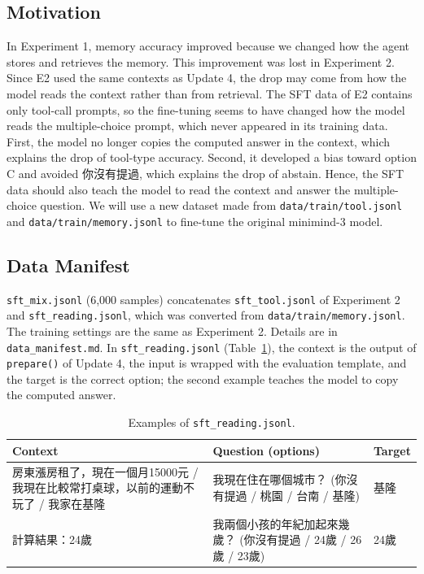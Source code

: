 \documentclass{article}
\begin{document}
\subsection{Motivation}
\label{sec:e3motivation}
In Experiment 1, memory accuracy improved because we changed how the agent stores and retrieves the memory.
This improvement was lost in Experiment 2.
Since E2 used the same contexts as Update 4, the drop may come from how the model reads the context rather than from retrieval.
The SFT data of E2 contains only tool-call prompts, so the fine-tuning seems to have changed how the model reads the multiple-choice prompt, which never appeared in its training data.
First, the model no longer copies the computed answer in the context, which explains the drop of tool-type accuracy.
Second, it developed a bias toward option C and avoided 你沒有提過, which explains the drop of abstain.
Hence, the SFT data should also teach the model to read the context and answer the multiple-choice question.
We will use a new dataset made from \texttt{data/train/tool.jsonl} and \texttt{data/train/memory.jsonl} to fine-tune the original minimind-3 model.
\subsection{Data Manifest}
\texttt{sft\_mix.jsonl} (6,000 samples) concatenates \texttt{sft\_tool.jsonl} of Experiment 2 and \texttt{sft\_reading.jsonl}, which was converted from \texttt{data/train/memory.jsonl}.
The training settings are the same as Experiment 2. Details are in \texttt{data\_manifest.md}.
In \texttt{sft\_reading.jsonl} (Table~\ref{tab:e3data}), the context is the output of \texttt{prepare()} of Update 4, the input is wrapped with the evaluation template, and the target is the correct option; the second example teaches the model to copy the computed answer.
\begin{table}[H]
    \centering
    \footnotesize
    \begin{tabular}{p{7.6cm}p{7.6cm}l}
        \toprule
        Context & Question (options) & Target \\
        \midrule
        房東漲房租了，現在一個月15000元 / 我現在比較常打桌球，以前的運動不玩了 / 我家在基隆 & 我現在住在哪個城市？ (你沒有提過 / 桃園 / 台南 / 基隆) & 基隆 \\
        計算結果：24歲 & 我兩個小孩的年紀加起來幾歲？ (你沒有提過 / 24歲 / 26歲 / 23歲) & 24歲 \\
        \bottomrule
    \end{tabular}
    \caption{Examples of \texttt{sft\_reading.jsonl}.}
    \label{tab:e3data}
\end{table}
\end{document}
